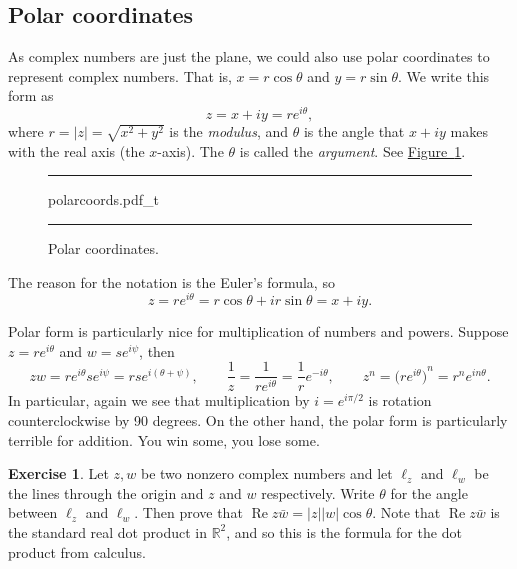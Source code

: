 \documentclass[12pt,openany]{book}
\renewcommand{\Re}{\operatorname{Re}}
\newcommand{\sabs}[1]{\lvert {#1} \rvert}
\newcommand{\R}{{\mathbb{R}}}
\newcommand{\myindex}[1]{#1\index{#1}}
\theoremstyle{plain}
\theoremstyle{remark}
\theoremstyle{definition}
\newenvironment{exbox}{%
    \def\FrameCommand{\vrule width 1pt \relax\hspace {10pt}}%
    \MakeFramed {\advance \hsize -\width \FrameRestore }%
}{%
    \endMakeFramed
}
\newenvironment{myfig}{%
\begin{figure}[h!t]
\noindent\rule{\textwidth}{0.4pt}\vspace{12pt}\par\centering}%
{\par\noindent\rule{\textwidth}{0.4pt}
\end{figure}}
\theoremstyle{exercise}
\newtheorem{exercise}{Exercise}[section]
\theoremstyle{example}
\newcommand{\figureref}[1]{\hyperref[#1]{Figure~\ref*{#1}}}
\begin{document}
\subsection{Polar coordinates}

As complex numbers are just the plane, we could also use polar coordinates
to represent complex numbers.
That is, $x = r \cos \theta$ and $y= r \sin \theta$.  We write this form as
\begin{equation*}
z = x+iy = r e^{i \theta} ,
\end{equation*}
where $r = \sabs{z} = \sqrt{x^2+y^2}$ is the \emph{\myindex{modulus}}, and 
$\theta$ is the angle that $x+iy$ makes with the real axis (the $x$-axis).
The $\theta$ is called the \emph{\myindex{argument}}.  See
\figureref{fig:polarcoords}.

\begin{myfig}
{polarcoords.pdf_t}
\caption{Polar coordinates.\label{fig:polarcoords}}
\end{myfig}

The reason for the notation is the
Euler's formula, so
\begin{equation*}
z = r e^{i\theta} = r\cos \theta + i r\sin \theta  = x+iy .
\end{equation*}

Polar form is particularly nice for multiplication of numbers and powers.
Suppose $z = r e^{i\theta}$ and $w = s e^{i \psi}$, then
\begin{equation*}
zw =
r e^{i \theta} s e^{i \psi} = 
rs e^{i (\theta+ \psi)},
\qquad
\frac{1}{z} =
\frac{1}{r e^{i \theta}} =
\frac{1}{r} e^{-i \theta} ,
\qquad
z^n =
{\bigl(r e^{i \theta}\bigr)}^n =
r^n e^{i n\theta} .
\end{equation*}
In particular, again we see that multiplication by $i = e^{i \pi / 2}$ is
rotation counterclockwise by 90 degrees.
On the other hand, the polar form is particularly terrible for addition.
You win some, you lose some.

\begin{exbox}
\begin{exercise}
Let $z,w$ be two nonzero complex numbers and let
$\ell_z$ and $\ell_w$ be the lines through the origin and
$z$ and $w$ respectively.  Write $\theta$ for the angle between $\ell_z$ and
$\ell_w$.  Then prove that
$\Re z\bar{w} = \sabs{z} \sabs{w} \cos \theta$.
Note that $\Re z\bar{w}$ is the standard real dot product in $\R^2$, and so
this is the formula for the dot product from calculus.
\end{exercise}
\end{exbox}
\end{document}
